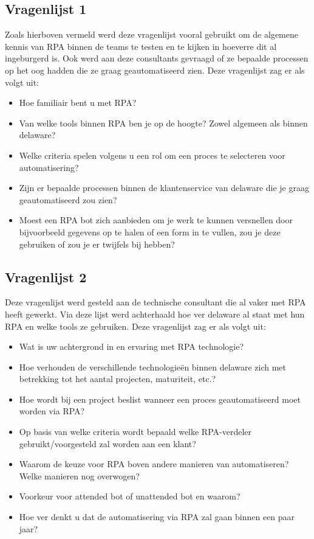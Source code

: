 \subsection{Vragenlijst 1}
\label{subsec:vragenlijst-1}

Zoals hierboven vermeld werd deze vragenlijst vooral gebruikt om de algemene kennis van RPA binnen de teams te testen en te kijken in hoeverre dit al ingeburgerd is. Ook werd aan deze consultants gevraagd of ze bepaalde processen op het oog hadden die ze graag geautomatiseerd zien. Deze vragenlijst zag er als volgt uit:

\begin{itemize}
    \item Hoe familiair bent u met RPA?
    \item Van welke tools binnen RPA ben je op de hoogte? Zowel algemeen als binnen delaware?
    \item Welke criteria spelen volgens u een rol om een proces te selecteren voor automatisering?
    \item Zijn er bepaalde processen binnen de klantenservice van delaware die je graag geautomatiseerd zou zien?
    \item Moest een RPA bot zich aanbieden om je werk te kunnen versnellen door bijvoorbeeld gegevens op te halen of een form in te vullen, zou je deze gebruiken of zou je er twijfels bij hebben?
\end{itemize}

\subsection{Vragenlijst 2}
\label{subsec:vragenlijst-2}

Deze vragenlijst werd gesteld aan de technische consultant die al vaker met RPA heeft gewerkt. Via deze lijst werd achterhaald hoe ver delaware al staat met hun RPA en welke tools ze gebruiken. Deze vragenlijst zag er als volgt uit:

\begin{itemize}
    \item Wat is uw achtergrond in en ervaring met RPA technologie?
    \item Hoe verhouden de verschillende technologieën binnen delaware zich met betrekking tot het aantal projecten, maturiteit, etc.?
    \item Hoe wordt bij een project beslist wanneer een proces geautomatiseerd moet worden via RPA?
    \item Op basis van welke criteria wordt bepaald welke RPA-verdeler gebruikt/voorgesteld zal worden aan een klant?
    \item Waarom de keuze voor RPA boven andere manieren van automatiseren? Welke manieren nog overwogen?
    \item Voorkeur voor attended bot of unattended bot en waarom?
    \item Hoe ver denkt u dat de automatisering via RPA zal gaan binnen een paar jaar?
\end{itemize}

